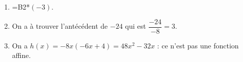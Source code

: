 
\medskip

%
%
%

\begin{enumerate}
\item %
=B2*$(- 3)$.
\item %
On a à trouver l'antécédent de $- 24$ qui est $\dfrac{-24}{- 8} = 3$.
\item %

On a $h(x) = - 8x (- 6x + 4) = 48x^2 - 32x$ : ce n'est pas une fonction affine.
\end{enumerate}
\vspace{0.25cm}

